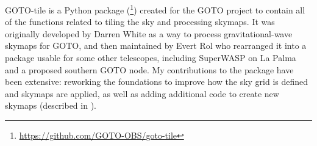 \begin{colsection}

GOTO-tile is a Python package (\footnote{\url{https://github.com/GOTO-OBS/goto-tile}}) created for the GOTO project to contain all of the functions related to tiling the sky and processing skymaps. It was originally developed by Darren White as a way to process gravitational-wave skymaps for GOTO, and then maintained by Evert Rol who rearranged it into a package usable for some other telescopes, including SuperWASP on La Palma and a proposed southern GOTO node. My contributions to the package have been extensive: reworking the foundations to improve how the sky grid is defined and skymaps are applied, as well as adding additional code to create new skymaps (described in ).

\end{colsection}


